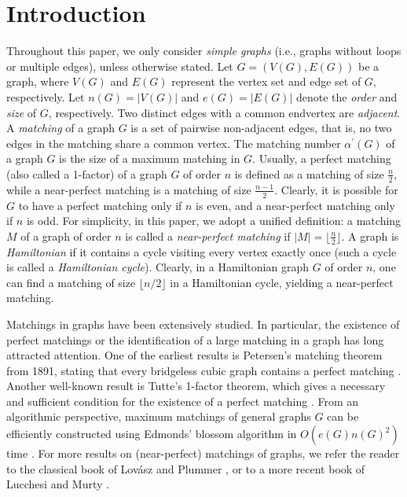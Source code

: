 \documentclass[12pt,a4paper]{article}
\begin{document}
\section{Introduction} Throughout this paper, we only consider \emph{simple graphs} (i.e., graphs without loops or multiple edges), unless otherwise stated. Let $G=(V(G),E(G))$ be a graph, where $V(G)$ and $E(G)$ represent the vertex set and edge set of $G$, respectively. Let $n(G) = |V(G)|$ and $e(G) = |E(G)|$ denote the \emph{order} and \emph{size} of $G$, respectively. Two distinct edges  with a common endvertex are \emph{adjacent}. 
 A \emph{matching} of a graph $G$ is a set of pairwise non-adjacent edges, that is, no two edges in the matching share a common vertex. The matching number $\alpha^{\prime}(G)$ of a graph $G$ is the size of a maximum matching in $G$. 
 Usually, a perfect matching (also called a 1-factor) of a graph $G$ of order $n$ is defined as a matching of size $\tfrac{n}{2}$, while a near-perfect matching is a matching of size $\tfrac{n-1}{2}$. Clearly, it is possible for $G$ to have a perfect matching only if $n$ is even, and a near-perfect matching only if $n$ is odd.  For simplicity, in this paper, we adopt a unified definition: a matching $M$ of a graph of order $n$ is called a \emph{ near-perfect matching} if $|M|=\lfloor \tfrac{n}{2} \rfloor$. A graph is \emph{Hamiltonian} if it contains a cycle visiting every vertex exactly once (such a cycle is called a \emph{Hamiltonian cycle}). Clearly,  in a Hamiltonian graph $G$ of order $n$, one can find a matching of size $\lfloor n/2 \rfloor$ in a Hamiltonian cycle, yielding a near-perfect matching. 

Matchings in graphs have been extensively studied. In particular, the existence of perfect matchings  or the identification of a large matching in a graph has long attracted attention. One of the earliest results is Petersen's matching theorem from 1891, stating that every bridgeless cubic graph contains a perfect matching \cite{MR1554815}.
Another well-known result is Tutte's 1-factor theorem, which gives a necessary and sufficient condition for the existence of a perfect matching \cite{MR0023048}. From an algorithmic perspective, maximum matchings of  general graphs $G$ can be efficiently constructed using Edmonds' blossom algorithm in $O(e(G)n(G)^2)$ time \cite{MR0177907}.
 For more results on (near-perfect) matchings of graphs, we refer the reader to the classical book of Lov\'{a}sz and Plummer \cite{MR0859549}, or to a more recent book of Lucchesi and Murty \cite{MR4769470}.  
\end{document}
